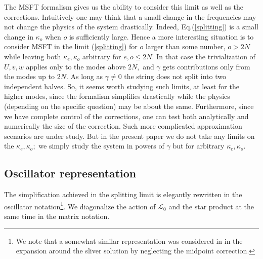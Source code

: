 \documentclass[a4paper,aps,preprint,nofootinbib,eqsecnum]{revtex4}
\begin{document}
The MSFT formalism gives us the ability to consider this limit as well as
the corrections. Intuitively one may think that a small change in the
frequencies may not change the physics of the system drastically. Indeed,
Eq.(\ref{splitting}) is a small change in $\kappa _{o}$ when $o$ is
sufficiently large. Hence a more interesting situation is to consider MSFT
in the limit (\ref{splitting}) for $o$ larger than some number, $o>2N$ while
leaving both $\kappa _{e},\kappa _{o}$ arbitrary for $e,o\leq 2N.$ In that
case the trivialization of $U,v,w$ applies only to the modes above $2N,$ and
$\gamma $ gets contributions only from the modes up to $2N.$ As long as $%
\gamma \neq 0$ the string does not split into two independent halves. So, it
seems worth studying such limits, at least for the higher modes, since the
formalism simplifies drastically while the physics (depending on the
specific question) may be about the same. Furthermore, since we have
complete control of the corrections, one can test both analytically and
numerically the size of the correction. Such more complicated approximation
scenarios are under study. But in the present paper we do not take any
limits on the $\kappa _{e},\kappa _{o};$ we simply study the system in
powers of $\gamma $ but for arbitrary $\kappa _{e},\kappa _{o}.$


\subsection{Oscillator representation}

\label{s:matrix} %
The simplification achieved in the splitting limit is elegantly rewritten in
the oscillator notation\footnote{%
We note that a somewhat similar representation was considered in \cite%
{Okuyama_et_al} in the expansion around the sliver solution by neglecting
the midpoint correction.}. We diagonalize the action of ${\mathcal{L}_{0}}$
and the star product at the same time in the matrix notation.
\end{document}
